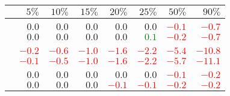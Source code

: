 \begin{center}
   \captionsetup{font=small}
  \begin{tabular}{lrrrrrrr}
    \toprule
                                & $5\%$                    & $10\%$                   & $15\%$                   & $20\%$                   & $25\%$                   & $50\%$                   & $90\%$                   \\
    \midrule
    & \multicolumn{7}{c}{\aut{}} \\ \cmidrule(lr){2-8}
    \uslpropGsecTwin{}          & $0.0$                    & $0.0$                    & $0.0$                    & $0.0$                    & $0.0$                    & \textcolor{Red}{$-0.1$}  & \textcolor{Red}{$-0.7$}  \\
    \usruleTwin{}               & $0.0$                    & $0.0$                    & $0.0$                    & $0.0$                    & \textcolor{Green}{$0.1$} & \textcolor{Red}{$-0.2$}  & \textcolor{Red}{$-0.7$}  \\
    & \multicolumn{7}{c}{\adv{}} \\ \cmidrule(lr){2-8}
    \uslpropGsecTwin{}          & \textcolor{Red}{$-0.2$}  & \textcolor{Red}{$-0.6$}  & \textcolor{Red}{$-1.0$}  & \textcolor{Red}{$-1.6$}  & \textcolor{Red}{$-2.2$}  & \textcolor{Red}{$-5.4$}  & \textcolor{Red}{$-10.8$} \\
    \usruleTwin{}               & \textcolor{Red}{$-0.1$}  & \textcolor{Red}{$-0.5$}  & \textcolor{Red}{$-1.0$}  & \textcolor{Red}{$-1.6$}  & \textcolor{Red}{$-2.2$}  & \textcolor{Red}{$-5.7$}  & \textcolor{Red}{$-11.1$} \\
    & \multicolumn{7}{c}{\wik{}} \\ \cmidrule(lr){2-8}
    \uslpropGsecTwin{}          & $0.0$                    & $0.0$                    & $0.0$                    & $0.0$                    & $0.0$                    & \textcolor{Red}{$-0.1$}  & \textcolor{Red}{$-0.2$}  \\
    \usruleTwin{}               & $0.0$                    & $0.0$                    & $0.0$                    & \textcolor{Red}{$-0.1$}  & \textcolor{Red}{$-0.1$}  & \textcolor{Red}{$-0.2$}  & \textcolor{Red}{$-0.2$}  \\

\end{tabular}
\end{center}
